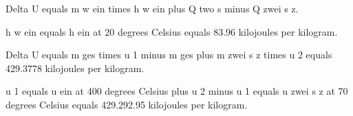 Delta U equals m w ein times h w ein plus Q two s minus Q zwei s z.

h w ein equals h ein at 20 degrees Celsius equals 83.96 kilojoules per kilogram.

Delta U equals m ges times u 1 minus m ges plus m zwei s z times u 2 equals 429.3778 kilojoules per kilogram.

u 1 equals u ein at 400 degrees Celsius plus u 2 minus u 1 equals u zwei s z at 70 degrees Celsius equals 429.292.95 kilojoules per kilogram.